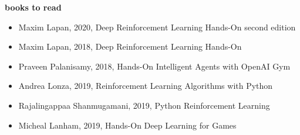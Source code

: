 \documentclass[xcolor=dvipsnames]{beamer}
\begin{document}
\begin{frame}{\bf books to read}


    \vspace*{-60ex} 
    {
        \begin{itemize}
          \item Maxim Lapan, 2020, Deep Reinforcement Learning Hands-On second edition
          \item Maxim Lapan, 2018, Deep Reinforcement Learning Hands-On
          \item Praveen Palanisamy, 2018, Hands-On Intelligent Agents with OpenAI Gym
          \item Andrea Lonza, 2019, Reinforcement Learning Algorithms with Python
          \item Rajalingappaa Shanmugamani, 2019, Python Reinforcement Learning
          \item Micheal Lanham, 2019, Hands-On Deep Learning for Games
        \end{itemize}
    }

\end{frame}
\end{document}
